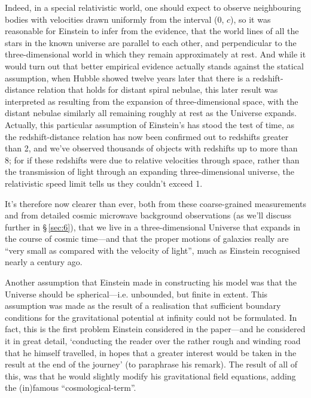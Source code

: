 \documentclass[12 pt]{article}
\begin{document}
Indeed, in a special relativistic world, one should expect to observe neighbouring bodies with velocities drawn uniformly from the interval (0, $c$), so it was reasonable for Einstein to infer from the evidence, that the world lines of all the stars in the known universe are parallel to each other, and perpendicular to the three-dimensional world in which they remain approximately at rest. And while it would turn out that better empirical evidence actually stands against the statical assumption, when Hubble showed twelve years later that there is a redshift-distance relation that holds for distant spiral nebulae, this later result was interpreted as resulting from the expansion of three-dimensional space, with the distant nebulae similarly all remaining roughly at rest as the Universe expands. Actually, this particular assumption of Einstein's has stood the test of time, as the redshift-distance relation has now been confirmed out to redshifts greater than 2, and we've observed thousands of objects with redshifts up to more than 8; for if these redshifts were due to relative velocities through space, rather than the transmission of light through an expanding three-dimensional universe, the relativistic speed limit tells us they couldn't exceed 1.

It's therefore now clearer than ever, both from these coarse-grained measurements and from detailed cosmic microwave background observations (as we'll discuss further in \S\,\ref{sec:6}), that we live in a three-dimensional Universe that expands in the course of cosmic time---and that the proper motions of galaxies really are ``very small as compared with the velocity of light'', much as Einstein recognised nearly a century ago.

Another assumption that Einstein made in constructing his model was that the Universe should be spherical---i.e. unbounded, but finite in extent. This assumption was made as the result of a realisation that sufficient boundary conditions for the gravitational potential at infinity could not be formulated. In fact, this is the first problem Einstein considered in the paper---and he considered it in great detail, `conducting the reader over the rather rough and winding road that he himself travelled, in hopes that a greater interest would be taken in the result at the end of the journey' (to paraphrase his remark). The result of all of this, was that he would slightly modify his gravitational field equations, adding the (in)famous ``cosmological-term''.
\end{document}
